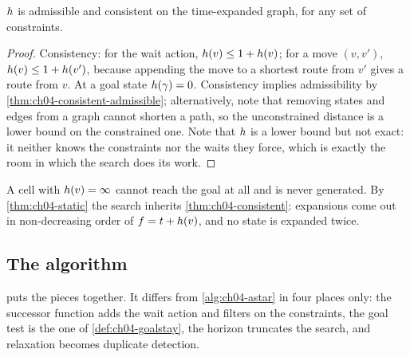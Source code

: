 \begin{proposition}
\label{thm:ch04-static}
$h$ is admissible and consistent on the time-expanded graph, for any set of
constraints.
\end{proposition}
\begin{proof}
Consistency: for the wait action, $h(v) \le 1 + h(v)$; for a move
$(v, v')$, $h(v) \le 1 + h(v')$, because appending the move to a
shortest route from $v'$ gives a route from $v$. At a goal state $h(\gamma)
= 0$. Consistency implies admissibility by
\cref{thm:ch04-consistent-admissible}; alternatively, note that removing states
and edges from a graph cannot shorten a path, so the unconstrained distance is a
lower bound on the constrained one. Note that $h$ is a lower bound but not
exact: it neither knows the constraints nor the waits they force, which is
exactly the room in which the search does its work.
\end{proof}

A cell with $h(v) = \infty$ cannot reach the goal at all and is never
generated. By \cref{thm:ch04-static} the search inherits
\cref{thm:ch04-consistent}: expansions come out in non-decreasing order of
$f = t + h(v)$, and no state is expanded twice.

\subsection{The algorithm}

 puts the pieces together. It differs from
\cref{alg:ch04-astar} in four places only: the successor function adds the wait
action and filters on the constraints, the goal test is the one of
\cref{def:ch04-goalstay}, the horizon truncates the search, and relaxation
becomes duplicate detection.


